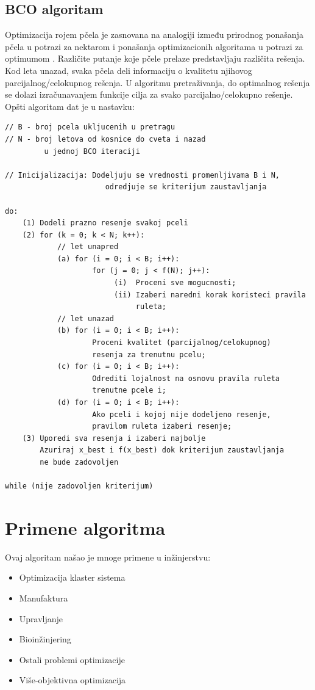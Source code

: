 \documentclass[a4paper]{article}
\begin{document}
{\subsection{BCO algoritam}
\label{subsec:bco}
Optimizacija rojem pčela je zasnovana na analogiji između prirodnog ponašanja pčela u potrazi za nektarom i ponašanja optimizacionih algoritama u potrazi za optimumom \cite{bcoalg}.
Različite putanje koje pčele prelaze predstavljaju različita rešenja. Kod leta unazad, svaka pčela deli informaciju o kvalitetu njihovog parcijalnog/celokupnog rešenja. U algoritmu pretraživanja, do optimalnog rešenja se dolazi izračunavanjem funkcije cilja za svako parcijalno/celokupno rešenje. Opšti algoritam dat je u nastavku:

\begin{lstlisting}[caption={Pseudokod {\em BCO} algoritma \cite{algoritam} },frame=single, label=simple]
// B - broj pcela ukljucenih u pretragu
// N - broj letova od kosnice do cveta i nazad 
	     u jednoj BCO iteraciji

// Inicijalizacija: Dodeljuju se vrednosti promenljivama B i N, 
		 		       odredjuje se kriterijum zaustavljanja

do:
    (1) Dodeli prazno resenje svakoj pceli
    (2) for (k = 0; k < N; k++):
    		// let unapred
    		(a) for (i = 0; i < B; i++):
    			    for (j = 0; j < f(N); j++):
    					 (i)  Proceni sve mogucnosti;
    					 (ii) Izaberi naredni korak koristeci pravila 
    					      ruleta;
    		// let unazad
    		(b) for (i = 0; i < B; i++):
    			    Proceni kvalitet (parcijalnog/celokupnog) 
    			    resenja	za trenutnu pcelu;
    		(c) for (i = 0; i < B; i++):  
    		    	Odrediti lojalnost na osnovu pravila ruleta
    		    	trenutne pcele i;
		    (d) for (i = 0; i < B; i++):
		       		Ako pceli i kojoj nije dodeljeno resenje, 
		       		pravilom ruleta izaberi resenje;
    (3) Uporedi sva resenja i izaberi najbolje
        Azuriraj x_best i f(x_best) dok kriterijum zaustavljanja
        ne bude zadovoljen
    
while (nije zadovoljen kriterijum)
\end{lstlisting}


\section{Primene algoritma}
Ovaj algoritam našao je mnoge primene u inžinjerstvu:

\begin{itemize}
	\item{Optimizacija klaster sistema}
	\item{Manufaktura} 
	\item{Upravljanje}
	\item{Bioinžinjering}
	\item{Ostali problemi optimizacije}
	\item{Više-objektivna optimizacija}
\end{itemize}


}
\end{document}
